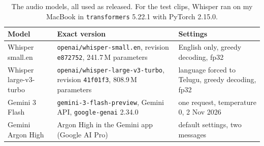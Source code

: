 \documentclass[11pt,a4paper]{article}
\newcommand{\code}[1]{\texttt{#1}}
\begin{document}
\begin{table}[!htbp]
\centering\footnotesize
\begin{tabularx}{\textwidth}{>{\raggedright\arraybackslash}p{2.6cm}>{\raggedright\arraybackslash}p{4.7cm}X}
\toprule
\textbf{Model} & \textbf{Exact version} & \textbf{Settings} \\
\midrule
Whisper small.en & \code{openai/whisper-small.en}, revision \code{e872752}, 241.7\,M parameters & English only, greedy decoding, fp32 \\
Whisper large-v3-turbo & \code{openai/whisper-large-v3-turbo}, revision \code{41f01f3}, 808.9\,M parameters & language forced to Telugu, greedy decoding, fp32 \\
Gemini 3 Flash & \code{gemini-3-flash-preview}, Gemini API, \code{google-genai} 2.34.0 & one request, temperature 0, 2 Nov 2026 \\
Gemini Argon High & Argon High in the Gemini app (Google AI Pro) & default settings, two messages \\
\bottomrule
\end{tabularx}
\caption{The audio models, all used as released. For the test clips, Whisper ran on my MacBook in \code{transformers} 5.22.1 with PyTorch 2.15.0.}
\label{tab:models}
\end{table}
\end{document}
